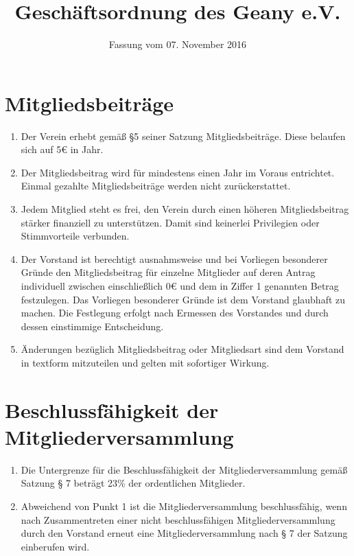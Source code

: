 \documentclass[fontsize=12pt,paper=a4,pagesize,headings=small]{scrartcl}
\title{Geschäftsordnung des Geany e.V.}
\date{Fassung vom 07. November 2016}
\begin{document}
\maketitle{}

\section{Mitgliedsbeiträge}
\begin{enumerate}
    \item Der Verein erhebt gemäß §5 seiner Satzung Mitgliedsbeiträge.
        Diese belaufen sich auf 5\euro{} in Jahr.

    \item Der Mitgliedsbeitrag wird für mindestens einen Jahr im Voraus
        entrichtet. Einmal gezahlte Mitgliedsbeiträge werden nicht
        zurückerstattet.

    \item Jedem Mitglied steht es frei, den Verein durch einen höheren
        Mitgliedsbeitrag stärker finanziell zu unterstützen. Damit sind
        keinerlei Privilegien oder Stimmvorteile verbunden.

    \item Der Vorstand ist berechtigt ausnahmsweise und bei Vorliegen
        besonderer Gründe den Mitgliedsbeitrag für einzelne Mitglieder
        auf deren Antrag individuell zwischen einschließlich 0\euro{}
        und dem in Ziffer 1 genannten Betrag festzulegen. Das Vorliegen
        besonderer Gründe ist dem Vorstand glaubhaft zu machen. Die
        Festlegung erfolgt nach Ermessen des Vorstandes und durch dessen
        einstimmige Entscheidung.

    \item Änderungen bezüglich Mitgliedsbeitrag oder Mitgliedsart sind dem
        Vorstand in textform mitzuteilen und gelten mit sofortiger Wirkung.
\end{enumerate}


\section{Beschlussfähigkeit der Mitgliederversammlung}
\begin{enumerate}
    \item Die Untergrenze für die Beschlussfähigkeit der
        Mitgliederversammlung gemäß Satzung § 7 beträgt 23\% der
        ordentlichen Mitglieder.

    \item Abweichend von Punkt 1 ist die Mitgliederversammlung
        beschlussfähig, wenn nach Zusammentreten einer nicht
        beschlussfähigen Mitgliederversammlung durch den
        Vorstand erneut eine Mitgliederversammlung nach § 7 der Satzung
        einberufen wird.
\end{enumerate}
\end{document}
